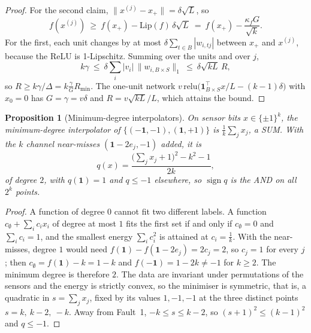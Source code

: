 \documentclass[11pt]{article}
\numberwithin{equation}{section}
\theoremstyle{plain}
\newtheorem{proposition}{Proposition}
\newcommand{\one}{\mathbf{1}}
\begin{document}
\begin{proof}
For the second claim, $\|x^{(j)}-x_+\|=\delta\sqrt L$, so
\begin{equation}\label{eq:lip}
  f(x^{(j)})\ \ge\ f(x_+)-\mathrm{Lip}(f)\,\delta\sqrt L\ =\ f(x_+)-\frac{\kappa_fG}{\sqrt k}.
\end{equation}
For the first, each unit changes by at most $\delta\sum_{t\in B}|w_{i,tj}|$ between $x_+$ and $x^{(j)}$, because the ReLU is 1-Lipschitz. Summing over the units and over $j$,
\begin{equation}\label{eq:pathnorm}
  k\gamma\ \le\ \delta\sum_i|v_i|\,\|w_{i,B\times S}\|_1\ \le\ \delta\sqrt{kL}\,R ,
\end{equation}
so $\boxed{R\ge k\gamma/\Delta=k\frac{\gamma}{G}R_{\min}}$. The one-unit network $v\,\mathrm{relu}\big(\one_{B\times S}^\top x/L-(k-1)\delta\big)$ with $x_0=0$ has $G=\gamma=v\delta$ and $R=v\sqrt{kL}/L$, which attains the bound.
\end{proof}

\begin{proposition}[Minimum-degree interpolators]\label{prop:md}
On sensor bits $x\in\{\pm1\}^k$, the minimum-degree interpolator \citep{abbe2023} of $\{(-\one,-1),(\one,+1)\}$ is $\frac1k\sum_jx_j$, a SUM. With the $k$ channel near-misses $(\one-2e_j,-1)$ added, it is
\begin{equation}\label{eq:md}
  \boxed{\;q(x)=\frac{\big(\sum_jx_j+1\big)^2-k^2-1}{2k},\;}
\end{equation}
of degree $2$, with $q(\one)=1$ and $q\le-1$ elsewhere, so $\operatorname{sign}q$ is the AND on all $2^k$ points.
\end{proposition}

\begin{proof}
A function of degree $0$ cannot fit two different labels. A function $c_\emptyset+\sum_ic_ix_i$ of degree at most $1$ fits the first set if and only if $c_\emptyset=0$ and $\sum_ic_i=1$, and the smallest energy $\sum_ic_i^2$ is attained at $c_i=\frac1k$. With the near-misses, degree $1$ would need $f(\one)-f(\one-2e_j)=2c_j=2$, so $c_j=1$ for every $j$; then $c_\emptyset=f(\one)-k=1-k$ and $f(-\one)=1-2k\ne-1$ for $k\ge2$. The minimum degree is therefore $2$. The data are invariant under permutations of the sensors and the energy is strictly convex, so the minimiser is symmetric, that is, a quadratic in $s=\sum_jx_j$, fixed by its values $1,-1,-1$ at the three distinct points $s=k,\ k-2,\ -k$. Away from Fault~1, $-k\le s\le k-2$, so $(s+1)^2\le(k-1)^2$ and $q\le-1$.
\end{proof}
\end{document}
